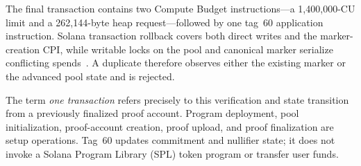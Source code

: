 The final transaction contains two Compute Budget instructions---a
1,400,000-CU limit and a 262,144-byte heap request---followed by one tag~60
application instruction.  Solana transaction rollback covers both direct
writes and the marker-creation CPI, while writable locks on the pool and
canonical marker serialize conflicting spends~\cite{SolanaTransactions,
SolanaComputeBudget}.  A duplicate therefore observes either the existing
marker or the advanced pool state and is rejected.

The term \emph{one transaction} refers precisely to this verification and
state transition from a previously finalized proof account.  Program
deployment, pool initialization, proof-account creation, proof upload, and
proof finalization are setup operations.  Tag~60 updates commitment and
nullifier state; it does not invoke a Solana Program Library (SPL) token
program or transfer user funds.
